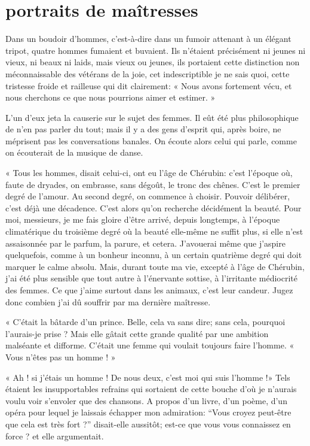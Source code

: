 \quebra\section[Portraits de maîtresses]{portraits de maîtresses }

Dans un boudoir d’hommes,
c’est{}-à{}-dire dans un fumoir attenant à un élégant
tripot, quatre hommes fumaient et buvaient. Ils
n’étaient précisément ni jeunes ni vieux, ni beaux ni
laids, mais vieux ou jeunes, ils portaient cette distinction non
méconnaissable des vétérans de la joie, cet indescriptible je ne sais
quoi, cette tristesse froide et railleuse qui dit clairement: « Nous
avons fortement vécu, et nous cherchons ce que nous pourrions aimer et
estimer. »

L’un d’eux jeta la causerie sur le
sujet des femmes. Il eût été plus philosophique de
n’en pas parler du tout; mais il y a des gens
d’esprit qui, après boire, ne méprisent pas les
conversations banales. On écoute alors celui qui parle, comme on
écouterait de la musique de danse.

« Tous les hommes, disait celui{}-ci, ont eu l’âge de
Chérubin: c’est l’époque où, faute de
dryades, on embrasse, sans dégoût, le tronc des chênes.
C’est le premier degré de l’amour. Au
second degré, on commence à choisir. Pouvoir délibérer,
c’est déjà une décadence. C’est alors
qu’on recherche décidément la beauté. Pour moi,
messieurs, je me fais gloire d’être arrivé, depuis
longtemps, à l’époque climatérique du troisième degré
où la beauté elle{}-même ne suffit plus, si elle n’est
assaisonnée par le parfum, la parure, et cetera.
J’avouerai même que j’aspire
quelquefois, comme à un bonheur inconnu, à un certain quatrième degré
qui doit marquer le calme absolu. Mais, durant toute ma vie, excepté à
l’âge de Chérubin, j’ai été plus
sensible que tout autre à l’énervante sottise, à
l’irritante médiocrité des femmes. Ce que
j’aime surtout dans les animaux,
c’est leur candeur. Jugez donc combien
j’ai dû souffrir par ma dernière maîtresse.

 « C’était la bâtarde d’un prince.
Belle, cela va sans dire; sans cela, pourquoi
l’aurais{}-je prise ? Mais elle gâtait cette grande
qualité par une ambition malséante et difforme.
C’était une femme qui voulait toujours faire
l’homme. « Vous n’êtes pas un homme !
»

« Ah ! si j’étais un homme ! De nous deux,
c’est moi qui suis l’homme !» Tels
étaient les insupportables refrains qui sortaient de cette bouche
d’où je n’aurais voulu voir
s’envoler que des chansons. A propos
d’un livre, d’un poème,
d’un opéra pour lequel je laissais échapper mon
admiration: ``Vous croyez peut{}-être que cela est
très fort ?'' disait{}-elle aussitôt; est{}-ce que vous vous connaissez
en force ? et elle argumentait.

